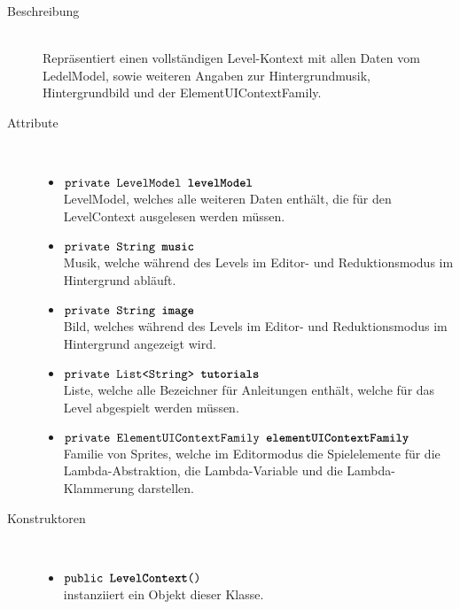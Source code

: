 \begin{description}
\item[Beschreibung] \hfill \\ Repräsentiert einen vollständigen Level-Kontext mit allen Daten vom LedelModel, sowie weiteren Angaben zur Hintergrundmusik, Hintergrundbild und der ElementUIContextFamily.

\item[Attribute] \hfill \\
	\vspace{-.8cm}
	\begin{itemize}
		\item $\texttt{private LevelModel \textbf{levelModel}}$ \\ LevelModel, welches alle weiteren Daten enthält, die für den LevelContext ausgelesen werden müssen.
		\item $\texttt{private String \textbf{music}}$ \\ Musik, welche während des Levels im Editor- und Reduktionsmodus im Hintergrund abläuft.
		\item $\texttt{private String \textbf{image}}$ \\ Bild, welches während des Levels im Editor- und Reduktionsmodus im Hintergrund angezeigt wird.
		\item $\texttt{private List<String> \textbf{tutorials}}$ \\ Liste, welche alle Bezeichner für Anleitungen enthält, welche für das Level abgespielt werden müssen.
		\item $\texttt{private ElementUIContextFamily \textbf{elementUIContextFamily}}$ \\ Familie von Sprites, welche im Editormodus die Spielelemente für die Lambda-Abstraktion, die Lambda-Variable und die Lambda-Klammerung darstellen.
		\end{itemize}
	
\item[Konstruktoren] \hfill \\
	\vspace{-.8cm}
	\begin{itemize}
		\item $\texttt{public \textbf{LevelContext}()}$ \\ instanziiert ein Objekt dieser Klasse.

	\end{itemize}
	

\end{description}
